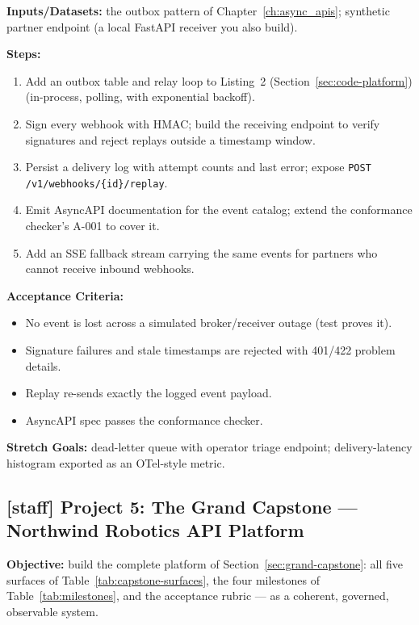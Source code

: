\textbf{Inputs/Datasets:} the outbox pattern of
Chapter~\ref{ch:async_apis}; synthetic partner endpoint (a local FastAPI
receiver you also build).

\textbf{Steps:}
\begin{enumerate}
  \item Add an outbox table and relay loop to Listing~2 (Section~\ref{sec:code-platform})
        (in-process, polling, with exponential backoff).
  \item Sign every webhook with HMAC; build the receiving endpoint to verify
        signatures and reject replays outside a timestamp window.
  \item Persist a delivery log with attempt counts and last error; expose
        \texttt{POST /v1/webhooks/\{id\}/replay}.
  \item Emit AsyncAPI documentation for the event catalog; extend the
        conformance checker's A-001 to cover it.
  \item Add an SSE fallback stream carrying the same events for partners
        who cannot receive inbound webhooks.
\end{enumerate}

\textbf{Acceptance Criteria:}
\begin{itemize}
  \item[$\square$] No event is lost across a simulated broker/receiver
        outage (test proves it).
  \item[$\square$] Signature failures and stale timestamps are rejected
        with 401/422 problem details.
  \item[$\square$] Replay re-sends exactly the logged event payload.
  \item[$\square$] AsyncAPI spec passes the conformance checker.
\end{itemize}

\textbf{Stretch Goals:} dead-letter queue with operator triage endpoint;
delivery-latency histogram exported as an OTel-style metric.

\subsection{[staff] Project 5: The Grand Capstone --- Northwind Robotics API Platform}

\textbf{Objective:} build the complete platform of
Section~\ref{sec:grand-capstone}: all five surfaces of
Table~\ref{tab:capstone-surfaces}, the four milestones of
Table~\ref{tab:milestones}, and the acceptance rubric --- as a coherent,
governed, observable system.

